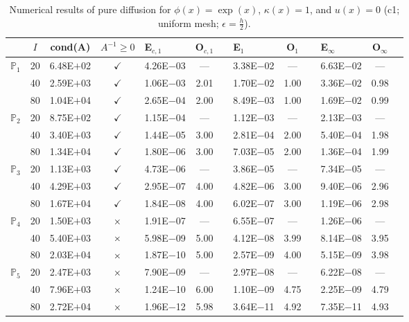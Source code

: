 \begin{table}[H]
\centering
\caption{Numerical results of pure diffusion for $\phi(x)=\exp(x)$, $\kappa(x)=1$, and $u(x)=0$ (c1; uniform mesh; $\epsilon=\frac{h}{2}$).}
\begin{tabular}{@{}l c c c l c c l c c l c c@{}}
\toprule
 & $I$ & cond(A) & $A^{-1}\geq 0$ &  E$_{c,1}$ & O$_{c,1}$ && E$_1$ & O$_1$ && E$_{\infty}$ & O$_{\infty}$\\
\midrule
\multirow{3}{*}{$\mathbb{P}_{1}$}
 & 20 & 6.48E$+$02 & $\checkmark$ & 4.26E$-$03 & --- && 3.38E$-$02 & --- && 6.63E$-$02 & ---\\
 & 40 & 2.59E$+$03 & $\checkmark$ & 1.06E$-$03 & 2.01 && 1.70E$-$02 & 1.00 && 3.36E$-$02 & 0.98\\
 & 80 & 1.04E$+$04 & $\checkmark$ & 2.65E$-$04 & 2.00 && 8.49E$-$03 & 1.00 && 1.69E$-$02 & 0.99\\
\midrule
\multirow{3}{*}{$\mathbb{P}_{2}$}
 & 20 & 8.75E$+$02 & $\checkmark$ & 1.15E$-$04 & --- && 1.12E$-$03 & --- && 2.13E$-$03 & ---\\
 & 40 & 3.40E$+$03 & $\checkmark$ & 1.44E$-$05 & 3.00 && 2.81E$-$04 & 2.00 && 5.40E$-$04 & 1.98\\
 & 80 & 1.34E$+$04 & $\checkmark$ & 1.80E$-$06 & 3.00 && 7.03E$-$05 & 2.00 && 1.36E$-$04 & 1.99\\
\midrule
\multirow{3}{*}{$\mathbb{P}_{3}$}
 & 20 & 1.13E$+$03 & $\checkmark$ & 4.73E$-$06 & --- && 3.86E$-$05 & --- && 7.34E$-$05 & ---\\
 & 40 & 4.29E$+$03 & $\checkmark$ & 2.95E$-$07 & 4.00 && 4.82E$-$06 & 3.00 && 9.40E$-$06 & 2.96\\
 & 80 & 1.67E$+$04 & $\checkmark$ & 1.84E$-$08 & 4.00 && 6.02E$-$07 & 3.00 && 1.19E$-$06 & 2.98\\
\midrule
\multirow{3}{*}{$\mathbb{P}_{4}$}
 & 20 & 1.50E$+$03 & $\times$ & 1.91E$-$07 & --- && 6.55E$-$07 & --- && 1.26E$-$06 & ---\\
 & 40 & 5.40E$+$03 & $\times$ & 5.98E$-$09 & 5.00 && 4.12E$-$08 & 3.99 && 8.14E$-$08 & 3.95\\
 & 80 & 2.03E$+$04 & $\times$ & 1.87E$-$10 & 5.00 && 2.57E$-$09 & 4.00 && 5.15E$-$09 & 3.98\\
\midrule
\multirow{3}{*}{$\mathbb{P}_{5}$}
 & 20 & 2.47E$+$03 & $\times$ & 7.90E$-$09 & --- && 2.97E$-$08 & --- && 6.22E$-$08 & ---\\
 & 40 & 7.96E$+$03 & $\times$ & 1.24E$-$10 & 6.00 && 1.10E$-$09 & 4.75 && 2.25E$-$09 & 4.79\\
 & 80 & 2.72E$+$04 & $\times$ & 1.96E$-$12 & 5.98 && 3.64E$-$11 & 4.92 && 7.35E$-$11 & 4.93\\
\bottomrule
\end{tabular}
\end{table}